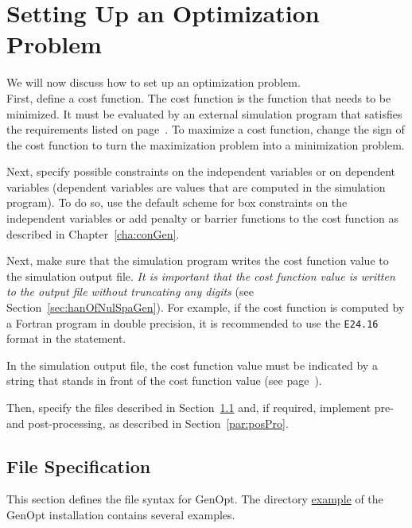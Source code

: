 \chapter{Setting Up an Optimization Problem}
\label{sec:SetUpOptPro}
We will now discuss how to set up an optimization problem.\\


First, define a cost function.
The cost function is the function that needs to be minimized.
It must be evaluated by an external simulation program
that satisfies the requirements listed on page~\pageref{lis:simProIntReq}.
To maximize a cost function, 
change the sign of the cost function to turn the maximization problem
into a minimization problem.

Next,
specify possible constraints on the independent variables
or on dependent variables 
(dependent variables are values that are computed in the simulation program).
To do so,
use the default scheme for box constraints on the 
independent variables or
add penalty or barrier functions to the cost function
as described in Chapter~\ref{cha:conGen}.

Next, make sure that the simulation program
writes the cost function value to the simulation output file.
\emph{It is important that the cost function value is written 
to the output file without truncating any digits} 
(see Section~\ref{sec:hanOfNulSpaGen}).
For example, if the cost function is computed by a Fortran program
in double precision, 
it is recommended to use the \verb$E24.16$ format in the  statement.

In the simulation output file, the cost function value must be indicated by a
string that stands in front of the cost function value
(see page~\pageref{ite:simFilOut}).

Then, specify the files described in Section~\ref{sec:FilSpe} and, if required,
implement pre- and post-processing, as described in Section~\ref{par:posPro}.\\

\section{File Specification}
\label{sec:FilSpe}
This section defines the file syntax for GenOpt.
The directory \url{example} of the GenOpt installation contains several examples.\\

